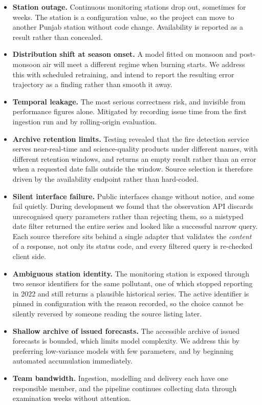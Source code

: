 \documentclass[11pt,a4paper]{article}
\begin{document}
\begin{itemize}[leftmargin=0.7cm]
  \item \textbf{Station outage.} Continuous monitoring
    stations drop out, sometimes for weeks. The station
    is a configuration value, so the project can move to
    another Punjab station without code change.
    Availability is reported as a result rather than
    concealed.
  \item \textbf{Distribution shift at season onset.} A
    model fitted on monsoon and post-monsoon air will
    meet a different regime when burning starts. We
    address this with scheduled retraining, and intend
    to report the resulting error trajectory as a
    finding rather than smooth it away.
  \item \textbf{Temporal leakage.} The most serious
    correctness risk, and invisible from performance
    figures alone. Mitigated by recording issue time
    from the first ingestion run and by rolling-origin
    evaluation.
  \item \textbf{Archive retention limits.} Testing
    revealed that the fire detection service serves
    near-real-time and science-quality products under
    different names, with different retention windows,
    and returns an empty result rather than an error
    when a requested date falls outside the window.
    Source selection is therefore driven by the
    availability endpoint rather than hard-coded.
  \item \textbf{Silent interface failure.} Public interfaces
    change without notice, and some fail quietly. During
    development we found that the observation API discards
    unrecognised query parameters rather than rejecting them,
    so a mistyped date filter returned the entire series and
    looked like a successful narrow query. Each source
    therefore sits behind a single adapter that validates the
    \emph{content} of a response, not only its status code,
    and every filtered query is re-checked client side.
  \item \textbf{Ambiguous station identity.} The monitoring
    station is exposed through two sensor identifiers for the
    same pollutant, one of which stopped reporting in 2022 and
    still returns a plausible historical series. The active
    identifier is pinned in configuration with the reason
    recorded, so the choice cannot be silently reversed by
    someone reading the source listing later.
  \item \textbf{Shallow archive of issued forecasts.}
    The accessible archive of issued forecasts is
    bounded, which limits model complexity. We address
    this by preferring low-variance models with few
    parameters, and by beginning automated accumulation
    immediately.
  \item \textbf{Team bandwidth.} Ingestion, modelling
    and delivery each have one responsible member, and
    the pipeline continues collecting data through
    examination weeks without attention.
\end{itemize}
\end{document}
